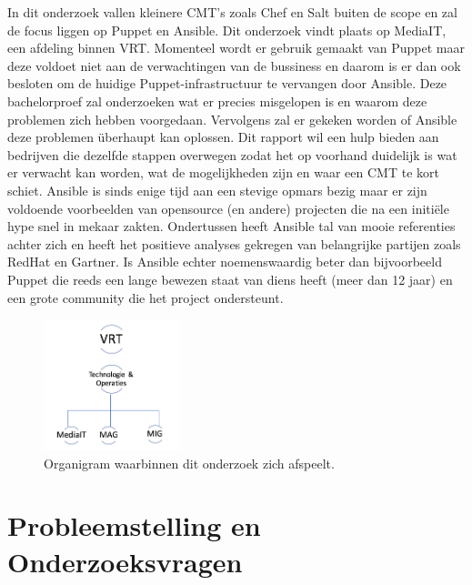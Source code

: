 In dit onderzoek vallen kleinere CMT's zoals Chef en Salt buiten de scope en zal de focus liggen op Puppet en Ansible. Dit onderzoek vindt plaats op MediaIT, een afdeling binnen VRT. Momenteel wordt er gebruik gemaakt van Puppet maar deze voldoet niet aan de verwachtingen van de bussiness en daarom is er dan ook besloten om de huidige Puppet-infrastructuur te vervangen door Ansible.
Deze bachelorproef zal onderzoeken wat er precies misgelopen is en waarom deze problemen zich hebben voorgedaan. Vervolgens zal er gekeken worden of Ansible deze problemen \"uberhaupt kan oplossen. Dit rapport wil een hulp bieden aan bedrijven die dezelfde stappen overwegen zodat het op voorhand duidelijk is wat er verwacht kan worden, wat de mogelijkheden zijn en waar een CMT te kort schiet. Ansible is sinds enige tijd aan een stevige opmars bezig maar er zijn voldoende voorbeelden van opensource (en andere) projecten die na een initi\"ele hype snel in mekaar zakten. Ondertussen heeft Ansible tal van mooie referenties achter zich en heeft het positieve analyses gekregen van belangrijke partijen zoals RedHat en Gartner. Is Ansible echter noemenswaardig beter dan bijvoorbeeld Puppet die reeds een lange bewezen staat van diens heeft (meer dan 12 jaar) en een grote community die het project ondersteunt.


\begin{figure}
  \begin{center}
\includegraphics[width=150px]{img/organigram}
\end{center}  \caption{Organigram waarbinnen dit onderzoek zich afspeelt.}
  \label{fig:infrastructuur}
\end{figure}


\section{Probleemstelling en Onderzoeksvragen}
\label{sec:onderzoeksvragen}



